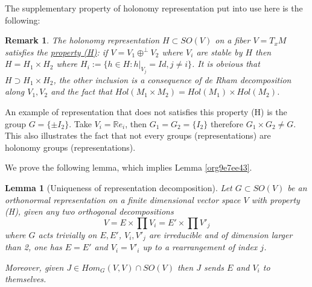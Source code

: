 \documentclass[11pt]{article}
\newtheorem{remark}{Remark}
\newtheorem{lemma}[theorem]{Lemma}
\begin{document}
The supplementary property of holonomy representation put into use here is the following:

\begin{remark}
The holonomy representation \(H\subset SO(V)\) on a fiber \(V=T_xM\) satisfies the \uline{property (H)}: if \(V
= V_1 \oplus^\perp V_2\) where \(V_i\) are stable by \(H\) then \(H = H_1\times H_2\) where \(H_i:= \{ h\in
H: h|_{V_j} = Id, j\ne i\}\). It is obvious that \(H\supset H_1\times H_2\), the other inclusion is a
consequence of de Rham decomposition along \(V_1, V_2\) and the fact that \(Hol(M_1\times M_2) =
Hol(M_1)\times Hol(M_2)\).
\end{remark}

An example of representation that does not satisfies this property (H) is the group \(G = \{\pm
I_2\}\). Take \(V_i = \mathbb{R}e_i\), then \(G_1 = G_2 = \{I_2\}\) therefore \(G_1\times G_2\ne
G\). This also illustrates the fact that not every groups (representations) are holonomy groups
(representations).

We prove the following lemma, which implies Lemma \ref{org9e7ee43}.
\begin{lemma}[Uniqueness of representation decomposition]
\label{lem:unique-representation}
\label{org1c1939c}
Let \(G\subset SO(V)\) be an orthonormal representation on a finite dimensional vector space \(V\) with
property (H), given any two orthogonal decompositions
\[
V = E \times \prod V_i = E' \times \prod V'_j
\]
where \(G\) acts trivially on \(E, E'\), \(V_i, V'_j\) are irreducible and of dimension larger than 2,
one has \(E = E'\) and \(V_i = V'_i\) up to a rearrangement of index \(j\).

Moreover, given \(J\in Hom_G(V,V)\cap SO(V)\) then \(J\) sends \(E\) and \(V_i\) to themselves.
\end{lemma}
\end{document}
